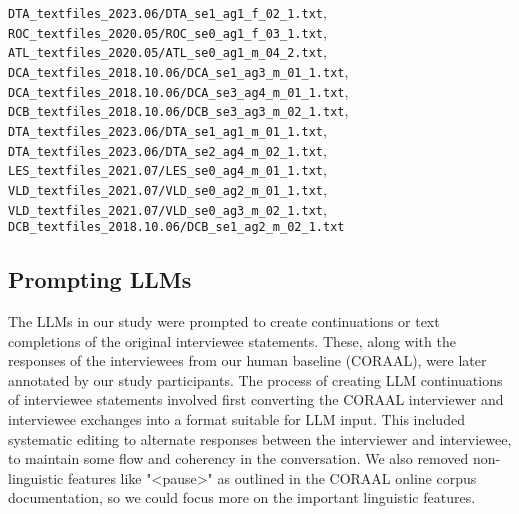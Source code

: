 {{        \texttt{DTA\_textfiles\_2023.06/DTA\_se1\_ag1\_f\_02\_1.txt},\\
        \texttt{ROC\_textfiles\_2020.05/ROC\_se0\_ag1\_f\_03\_1.txt},\\
        \texttt{ATL\_textfiles\_2020.05/ATL\_se0\_ag1\_m\_04\_2.txt},\\
        \texttt{DCA\_textfiles\_2018.10.06/DCA\_se1\_ag3\_m\_01\_1.txt},\\
        \texttt{DCA\_textfiles\_2018.10.06/DCA\_se3\_ag4\_m\_01\_1.txt},\\
        \texttt{DCB\_textfiles\_2018.10.06/DCB\_se3\_ag3\_m\_02\_1.txt},\\
        \texttt{DTA\_textfiles\_2023.06/DTA\_se1\_ag1\_m\_01\_1.txt},\\
        \texttt{DTA\_textfiles\_2023.06/DTA\_se2\_ag4\_m\_02\_1.txt},\\
        \texttt{LES\_textfiles\_2021.07/LES\_se0\_ag4\_m\_01\_1.txt},\\
        \texttt{VLD\_textfiles\_2021.07/VLD\_se0\_ag2\_m\_01\_1.txt},\\
        \texttt{VLD\_textfiles\_2021.07/VLD\_se0\_ag3\_m\_02\_1.txt},\\
        \texttt{DCB\_textfiles\_2018.10.06/DCB\_se1\_ag2\_m\_02\_1.txt}
    }%
}

\newpage
\subsection{Prompting LLMs}
The LLMs in our study were prompted to create continuations or text completions of the original interviewee statements. These, along with the responses of the interviewees from our human baseline (CORAAL), were later annotated by our study participants. The process of creating LLM continuations of interviewee statements involved first converting the CORAAL interviewer and interviewee exchanges into a format suitable for LLM input. This included systematic editing to alternate responses between the interviewer and interviewee, to maintain some flow and coherency in the conversation. We also removed non-linguistic features like "<pause>" as outlined in the CORAAL online corpus documentation, so we could focus more on the important linguistic features.

